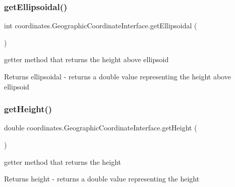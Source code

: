 \subsubsection{\texorpdfstring{get\+Ellipsoidal()}{getEllipsoidal()}}
{\footnotesize\ttfamily int coordinates.\+Geographic\+Coordinate\+Interface.\+get\+Ellipsoidal (\begin{DoxyParamCaption}{ }\end{DoxyParamCaption})}



getter method that returns the height above ellipsoid 

\begin{DoxyReturn}{Returns}
ellipsoidal -\/ returns a double value representing the height above ellipsoid 
\end{DoxyReturn}
\mbox{\label{classcoordinates_1_1_geographic_coordinate_interface_aa74362408871d3bf33e69f6e2ffa52b6}} 
\subsubsection{\texorpdfstring{get\+Height()}{getHeight()}}
{\footnotesize\ttfamily double coordinates.\+Geographic\+Coordinate\+Interface.\+get\+Height (\begin{DoxyParamCaption}{ }\end{DoxyParamCaption})}



getter method that returns the height 

\begin{DoxyReturn}{Returns}
height -\/ returns a double value representing the height 
\end{DoxyReturn}
\mbox{\label{classcoordinates_1_1_geographic_coordinate_interface_a954409872a73cc8c7fc49f87d17f88b5}} 

